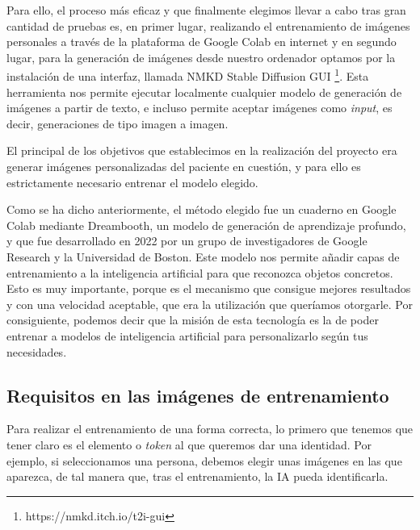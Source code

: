 Para ello, el proceso más eficaz y que finalmente elegimos llevar a cabo tras gran cantidad de pruebas es, en primer lugar, realizando el entrenamiento de imágenes personales a través de la plataforma de Google Colab en internet y en segundo lugar, para la generación de imágenes desde nuestro ordenador optamos por la instalación de una interfaz, llamada NMKD Stable Diffusion GUI \footnote{https://nmkd.itch.io/t2i-gui}. Esta herramienta nos permite ejecutar localmente cualquier modelo de generación de imágenes a partir de texto, e incluso permite aceptar imágenes como \textit{input}, es decir, generaciones de tipo imagen a imagen. 

El principal de los objetivos que establecimos en la realización del proyecto era generar imágenes personalizadas del paciente en cuestión, y para ello es estrictamente necesario entrenar el modelo elegido.

Como se ha dicho anteriormente, el método elegido fue un cuaderno en Google Colab mediante Dreambooth,  un modelo de generación de aprendizaje profundo, y que fue desarrollado en 2022 por un grupo de investigadores de Google Research y la Universidad de Boston.  Este modelo nos permite añadir capas de entrenamiento a la inteligencia artificial para que reconozca objetos concretos. Esto es muy importante, porque es el mecanismo que consigue mejores resultados y con una velocidad aceptable, que era la utilización que queríamos otorgarle. Por consiguiente, podemos decir que la misión de esta tecnología es la de poder entrenar a modelos de inteligencia artificial para personalizarlo según tus necesidades.

\subsection{Requisitos en las imágenes de entrenamiento}

Para realizar el entrenamiento de una forma correcta, lo primero que tenemos que tener claro es  el elemento o \textit{token} al que queremos dar una identidad. Por ejemplo, si seleccionamos una persona, debemos elegir unas imágenes en las que aparezca, de tal manera que, tras el entrenamiento, la IA pueda identificarla. 

